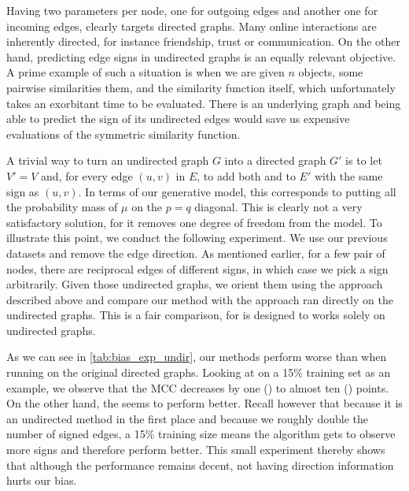 Having two parameters per node, one for outgoing edges and another one for incoming edges, clearly
targets directed graphs. Many online interactions are inherently directed, for instance friendship,
trust or communication. On the other hand, predicting edge signs in undirected graphs is an equally
relevant objective. A prime example of such a situation is when we are given $n$ objects, some
pairwise similarities them, and the similarity function itself, which unfortunately takes an
exorbitant time to be evaluated. There is an underlying graph and being able to predict the sign of
its undirected edges would save us expensive evaluations of the symmetric similarity function.

A trivial way to turn an undirected graph $G$ into a directed graph $G'$ is to let $V'=V$ and, for
every edge $(u,v)$ in $E$, to add both \euv{} and \evu{} to $E'$ with the same sign as $(u,v)$. In
terms of our generative model, this corresponds to putting all the probability mass of $\mu$ on the
$p=q$ diagonal. This is clearly not a very satisfactory solution, for it removes one degree of
freedom from the model. To illustrate this point, we conduct the following experiment. We use our
previous \dssn{} datasets and remove the edge direction. As mentioned earlier, for a few pair of
nodes, there are reciprocal edges of different signs, in which case we pick a sign arbitrarily. Given
those undirected graphs, we orient them using the approach described above and compare our method
with the \complowrank{} approach ran directly on the undirected graphs. This is a fair comparison,
for \complowrank{} is designed to works solely on undirected graphs.

As we can see in \autoref{tab:bias_exp_undir}, our methods perform worse than when running on the
original directed graphs. Looking at \uslpropGsec{} on a 15\% training set as an example, we observe
that the MCC decreases by one (\kiw{}) to almost ten (\epi{}) points. On the other hand, the
\complowrank{} seems to perform better. Recall however that because it is an undirected method in
the first place and because we roughly double the number of signed edges, a 15\% training size means
the algorithm gets to observe more signs and therefore perform better. This small experiment thereby
shows that although the performance remains decent, not having direction information hurts our bias.


